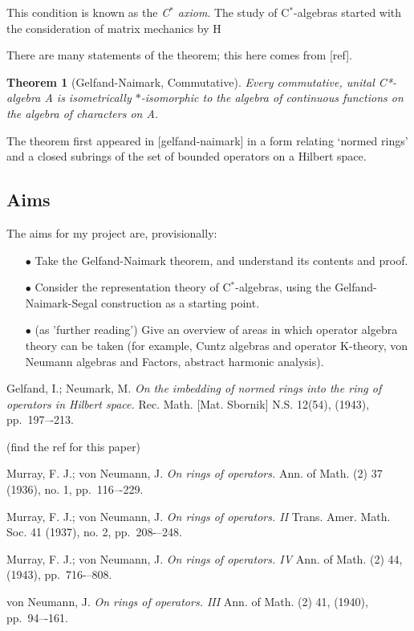 \documentclass[12pt,a4paper]{amsart}
\theoremstyle{plain}
\newtheorem*{thm*}{Theorem}
\theoremstyle{defn}
\begin{document}
This condition is known as the \emph{C$^\ast$ axiom}. The study of C$^\ast$-algebras started with the consideration of matrix mechanics by H

There are many statements of the theorem; this here comes from [ref].
\begin{thm*}[Gelfand-Naimark, Commutative]
	Every commutative, unital C*-algebra A is isometrically $\ast$-isomorphic to the algebra of continuous functions on the algebra of characters on A.

\end{thm*}
The theorem first appeared in [gelfand-naimark] in a form relating `normed rings' and a closed subrings of the set of bounded operators on a Hilbert space.


\subsection{Aims}
The aims for my project are, provisionally:
\begin{enumerate}

	\item[$\bullet$] Take the Gelfand-Naimark theorem, and understand its contents and proof.
	\item[$\bullet$] Consider the representation theory of C$^\ast$-algebras, using the Gelfand-Naimark-Segal construction as a starting point.
	\item[$\bullet$] (as 'further reading') Give an overview of areas in which operator algebra theory can be taken (for example, Cuntz algebras and operator K-theory, von Neumann algebras and Factors, abstract harmonic analysis).
\end{enumerate}

\begin{thebibliography}{00}
	Gelfand, I.; Neumark, M.
	\emph{On the imbedding of normed rings into the ring of operators in Hilbert space.}
	Rec. Math. [Mat. Sbornik] N.S. 12(54), (1943), pp.~197–-213.

	(find the ref for this paper)
	
	Murray, F. J.; von Neumann, J.
	\emph{On rings of operators.}
	Ann. of Math. (2) 37 (1936), no. 1, pp.~116–-229.

	
	Murray, F. J.; von Neumann, J.
	\emph{On rings of operators. II}
	Trans. Amer. Math. Soc. 41 (1937), no. 2, pp.~208-–248. 


	
	Murray, F. J.; von Neumann, J.
	\emph{On rings of operators. IV}
	Ann. of Math. (2) 44, (1943), pp.~716-–808.

	
	von Neumann, J.
	\emph{On rings of operators. III}
	Ann. of Math. (2) 41, (1940), pp.~94–-161.

	
\end{thebibliography}
\end{document}
